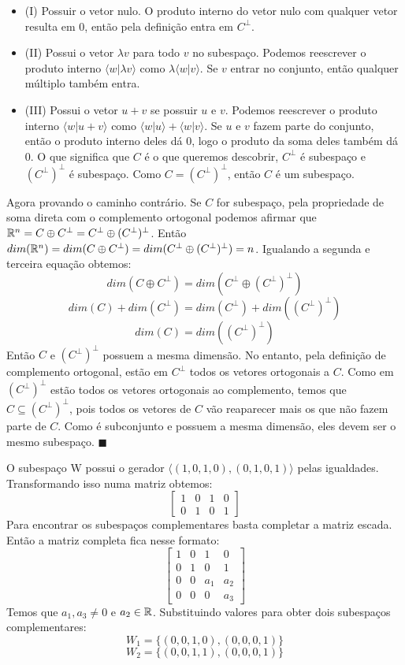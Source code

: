 \documentclass{homework}
\begin{document}
\begin{itemize}
\item(I) Possuir o vetor nulo. O produto interno do vetor nulo com qualquer vetor resulta em 0, então pela definição entra em $C^\perp$.

\item(II) Possui o vetor $\lambda v$ para todo $v$ no subespaço. Podemos reescrever o produto interno $\langle w|\lambda v\rangle$ como $\lambda \langle w|v \rangle$. Se $v$ entrar no conjunto, então qualquer múltiplo também entra.   

\item(III) Possui o vetor $u+v$ se possuir $u$ e $v$. Podemos reescrever o produto interno $\langle w|u+v \rangle$ como $\langle w|u \rangle + \langle w|v \rangle$. Se $u$ e $v$ fazem parte do conjunto, então o produto interno deles dá 0, logo o produto da soma deles também dá 0.
O que significa que $C$ é o que queremos descobrir, $C^\perp$ é subespaço e $(C^\perp)^\perp$ é subespaço. Como $C = (C^\perp)^\perp$, então $C$ é um subespaço. 
\end{itemize}

Agora provando o caminho contrário. Se $C$ for subespaço, pela propriedade de soma direta com o complemento ortogonal podemos afirmar que $\mathbb R^n = C \oplus C^\perp = C^\perp \oplus (C^\perp)^\perp$. Então $dim(\mathbb R ^ n) = dim(C \oplus C^\perp) = dim(C^\perp \oplus (C^\perp)^\perp) = n$. Igualando a segunda e terceira equação obtemos:
\[dim(C \oplus C^\perp) = dim(C^\perp \oplus (C^\perp)^\perp)\]
\[dim(C) + dim(C^\perp) = dim(C^\perp) + dim((C^\perp)^\perp)\]
\[dim(C) = dim((C^\perp)^\perp)\]
Então $C$ e $(C^\perp)^\perp$ possuem a mesma dimensão. No entanto, pela definição de complemento ortogonal, estão em $C^\perp$ todos os vetores ortogonais a $C$. Como em $(C^\perp)^\perp$ estão todos os vetores ortogonais ao complemento, temos que $C \subseteq (C^\perp)^\perp$, pois todos os vetores de $C$ vão reaparecer mais os que não fazem parte de $C$. Como é subconjunto e possuem a mesma dimensão, eles devem ser o mesmo subespaço. $\blacksquare$

\exercise*
O subespaço W possui o gerador $\langle(1,0,1,0),(0,1,0,1)\rangle$ pelas igualdades. Transformando isso numa matriz obtemos:
\[\begin{bmatrix}
1 & 0 & 1 & 0\\
0 & 1 & 0 & 1
\end{bmatrix}\]
Para encontrar os subespaços complementares basta completar a matriz escada. Então a matriz completa fica nesse formato:
\[
\begin{bmatrix}
1 & 0 & 1 & 0\\
0 & 1 & 0 & 1\\
0 & 0 & a_1 & a_2\\
0 & 0 & 0 & a_3
\end{bmatrix}
\]
Temos que $a_1,a_3 \neq 0$ e $a_2 \in \mathbb R$. Substituindo valores para obter dois subespaços complementares:
\[W_1 = \{(0,0,1,0),(0,0,0,1)\}\]
\[W_2 = \{(0,0,1,1),(0,0,0,1)\}\]
\end{document}
